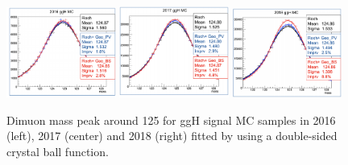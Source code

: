 \begin{figure}[h!]
    \centering
    \includegraphics[width=0.32\textwidth]{images_geofit/ggH_mass_geofit_2016.png}
    \includegraphics[width=0.32\textwidth]{images_geofit/ggH_mass_geofit_2017.png}
    \includegraphics[width=0.32\textwidth]{images_geofit/ggH_mass_geofit_2018.png}
    \caption{Dimuon mass peak around 125 \gev for ggH signal MC samples in 2016 (left), 2017 (center) and 2018 (right) fitted by using a double-sided crystal ball function.}
    \label{fig:dimu_mass_ggH}
\end{figure}

